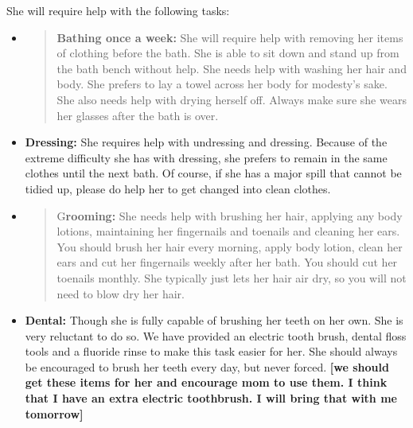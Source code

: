 \documentclass[]{article}
\begin{document}
She will require help with the following tasks:

\begin{itemize}
\item
  \begin{quote}
  \textbf{Bathing once a week:} She will require help with removing her
  items of clothing before the bath. She is able to sit down and stand
  up from the bath bench without help. She needs help with washing her
  hair and body. She prefers to lay a towel across her body for
  modesty's sake. She also needs help with drying herself off. Always
  make sure she wears her glasses after the bath is over.
  \end{quote}
\end{itemize}

\begin{itemize}
\item
  \textbf{Dressing:} She requires help with undressing and dressing.
  Because of the extreme difficulty she has with dressing, she prefers
  to remain in the same clothes until the next bath. Of course, if she
  has a major spill that cannot be tidied up, please do help her to get
  changed into clean clothes.
\end{itemize}

\begin{itemize}
\item
  \begin{quote}
  G\textbf{rooming:} She needs help with brushing her hair, applying any
  body lotions, maintaining her fingernails and toenails and cleaning
  her ears. You should brush her hair every morning, apply body lotion,
  clean her ears and cut her fingernails weekly after her bath. You
  should cut her toenails monthly. She typically just lets her hair air
  dry, so you will not need to blow dry her hair.
  \end{quote}
\end{itemize}

\begin{itemize}
\item
  \textbf{Dental:} Though she is fully capable of brushing her teeth on
  her own. She is very reluctant to do so. We have provided an electric
  tooth brush, dental floss tools and a fluoride rinse to make this task
  easier for her. She should always be encouraged to brush her teeth
  every day, but never forced. \textbf{{[}we should get these items for
  her and encourage mom to use them. I think that I have an extra
  electric toothbrush. I will bring that with me tomorrow{]}}
\end{itemize}
\end{document}
